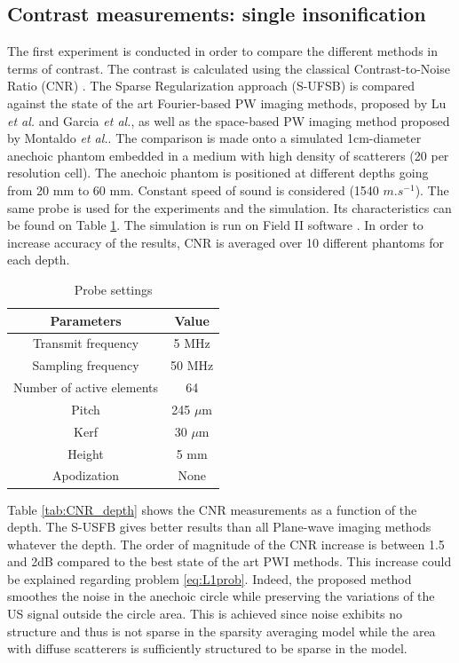 \documentclass[conference]{IEEEtran}
\newcommand{\etal}{\textit{et al.}}
\begin{document}
\subsection{Contrast measurements: single insonification}
The first experiment is conducted in order to compare the different methods in terms of contrast. The contrast is calculated using the classical Contrast-to-Noise Ratio (CNR) \cite{vanWijk_ULT_2002}.
The Sparse Regularization approach (S-UFSB) is compared against the state of the art Fourier-based PW imaging methods, proposed by Lu \etal \cite{Lu_UFFC_97} and Garcia \etal \cite{garcia_uffc_2013}, as well as the space-based PW imaging method proposed by Montaldo \etal \cite{Montaldo_UFFC_2014}.
The comparison is made onto a simulated 1cm-diameter anechoic phantom embedded in a medium with high density of scatterers (20 per resolution cell). The anechoic phantom is positioned at different depths going from 20 mm to 60 mm. Constant speed of sound is considered (1540 $m.s^{-1}$). The same probe is used for the experiments and the simulation. Its characteristics can be found on Table \ref{tab:ProbeParam}. 
The simulation is run on Field II software \cite{Jensen_JASA_1991}. In order to increase accuracy of the results, CNR is averaged over 10 different phantoms for each depth.
\begin{table}[htb]
\centering
\caption{Probe settings}
\renewcommand{\arraystretch}{1.0}
 \begin{tabular}{c c}
  \toprule
  \bf \footnotesize Parameters & \bf \footnotesize Value \\
  \midrule
  Transmit frequency & 5 MHz \\
  Sampling frequency & 50 MHz \\
  Number of active elements & 64 \\
  Pitch & 245 $\mu$m \\
  Kerf & 30 $\mu$m \\
  Height & 5 mm \\  
  Apodization & None \\
 \bottomrule
 \end{tabular} 
\label{tab:ProbeParam}
\end{table}
\par Table \ref{tab:CNR_depth} shows the CNR measurements as a function of the depth. The S-USFB gives better results than all Plane-wave imaging methods whatever the depth. The order of magnitude of the CNR increase is between 1.5 and 2dB compared to the best state of the art PWI methods. This increase could be explained regarding problem \eqref{eq:L1prob}. Indeed, the proposed method smoothes the noise in the anechoic circle while preserving the variations of the US signal outside the circle area. This is achieved since noise exhibits no structure and thus is not sparse in the sparsity averaging model while the area with diffuse scatterers is sufficiently structured to be sparse in the model.  
\end{document}
